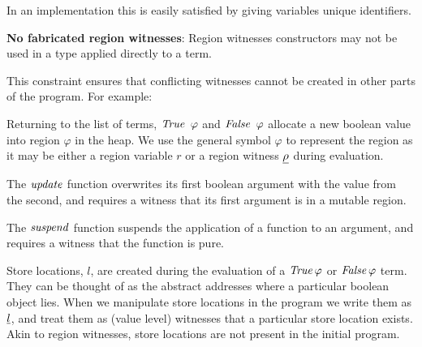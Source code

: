 In an implementation this is easily satisfied by giving variables unique identifiers.

\textbf{No fabricated region witnesses}: Region witnesses constructors may not be used in a type applied directly to a term.

This constraint ensures that conflicting witnesses cannot be created in other parts of the program. For example:


\bigskip

Returning to the list of terms, $\iTrue \ \varphi$ and $\operatorname{\mathit{False}} \ \varphi$ allocate a new boolean value into region $\varphi$ in the heap. We use the general symbol $\varphi$ to represent the region as it may be either a region variable $r$ or a region witness $\underline{\rho}$ during evaluation.

The $\operatorname{\mathit{update}}$ function overwrites its first boolean argument with the value from the second, and requires a witness that its first argument is in a mutable region. 

The $\operatorname{\mathit{suspend}}$ function suspends the application of a function to an argument, and requires a witness that the function is pure.

Store locations, $l$, are created during the evaluation of a $\operatorname{\mathit{True}} \varphi$ or $\operatorname{\mathit{False}} \varphi$ term. They can be thought of as the abstract addresses where a particular boolean object lies. When we manipulate store locations in the program we write them as $\underline{l}$, and treat them as (value level) witnesses that a particular store location exists. Akin to region witnesses, store locations are not present in the initial program.
